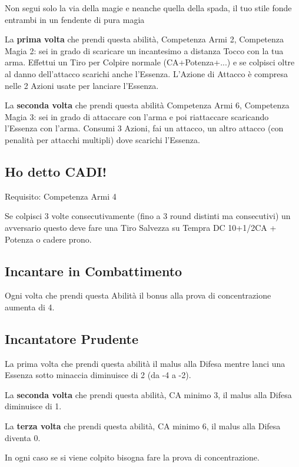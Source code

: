 \documentclass[a4paper,11pt,twoside,openany]{book}
\begin{document}
Non segui solo la via della magie e neanche quella della spada, il tuo stile fonde entrambi in un fendente di pura magia

La \textbf{prima volta} che prendi questa abilità, Competenza Armi 2, Competenza Magia 2: sei in grado di scaricare un incantesimo a distanza Tocco con la tua arma. Effettui un Tiro per Colpire normale (CA+Potenza+...) e se colpisci oltre al danno dell'attacco scarichi anche l'Essenza. L'Azione di Attacco è compresa nelle 2 Azioni usate per lanciare l'Essenza.

La \textbf{seconda volta} che prendi questa abilità Competenza Armi 6, Competenza Magia 3: sei in grado di attaccare con l'arma e poi riattaccare scaricando l'Essenza con l'arma. Consumi 3 Azioni, fai un attacco, un altro attacco (con penalità per attacchi multipli) dove scarichi l'Essenza.

\subsection{Ho detto CADI!}

Requisito: Competenza Armi 4

Se colpisci 3 volte consecutivamente (fino a 3 round distinti ma consecutivi) un avversario questo deve fare una Tiro Salvezza su Tempra DC 10+1/2CA + Potenza o cadere prono.

\subsection{Incantare in Combattimento}

Ogni volta che prendi questa Abilità il bonus alla prova di concentrazione aumenta di 4.

\subsection{Incantatore Prudente}

La prima volta che prendi questa abilità il malus alla Difesa mentre lanci una Essenza sotto minaccia diminuisce di 2 (da -4 a -2).

La \textbf{seconda volta} che prendi questa abilità, CA minimo 3, il malus alla Difesa diminuisce di 1.

La \textbf{terza volta} che prendi questa abilità, CA minimo 6, il malus alla Difesa diventa 0.

In ogni caso se si viene colpito bisogna fare la prova di concentrazione.
\end{document}
